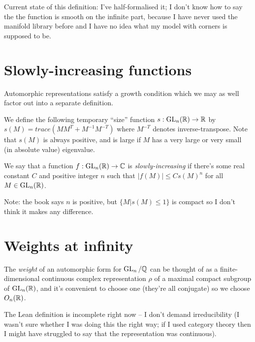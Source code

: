 Current state of this definition: I've half-formalised it; I don't know how to say the the
function is smooth on the infinite part, because I have never used the manifold library before
and I have no idea what my model with corners is supposed to be.

\section{Slowly-increasing functions}

Automorphic representations satisfy a growth condition which we may as well factor out
into a separate definition.

We define the following temporary ``size'' function $s:\operatorname{GL}_n(\mathbb{R})\to\mathbb{R}$ by
$s(M)=trace(MM^T+M^{-1}M^{-T})$ where $M^{-T}$ denotes inverse-transpose. Note that
$s(M)$ is always positive, and is large if $M$ has a very large or very small
(in absolute value) eigenvalue.

\begin{definition}
  \label{AutomorphicForm.GLn.IsSlowlyIncreasing}
  \leanok
  We say that a function $f:\operatorname{GL}_n(\mathbb{R})\to\mathbb{C}$ is \emph{slowly-increasing}
  if there's some real constant $C$ and positive integer $n$ such that $|f(M)|\leq Cs(M)^n$
  for all $M\in\operatorname{GL}_n(\mathbb{R})$.
\end{definition}

Note: the book says $n$ is positive, but $\{M|s(M)\leq 1\}$ is compact so I don't
think it makes any difference.

\section{Weights at infinity}

\begin{definition}
  \label{AutomorphicForm.GLn.weight}

The \emph{weight} of an automorphic form for $\operatorname{GL}_n/\mathbb{Q}$ can be thought of as a finite-dimensional
continuous complex representation $\rho$ of a maximal compact subgroup of $\operatorname{GL}_n(\mathbb{R})$,
and it's convenient to choose one (they're all conjugate) so we choose $O_n(\mathbb{R})$.
\end{definition}

The Lean definition is incomplete right now -- I don't demand irreducibility
(I wasn't sure whether I was doing this the right way; if I used category theory
then I might have struggled to say that the representation was continuous).


